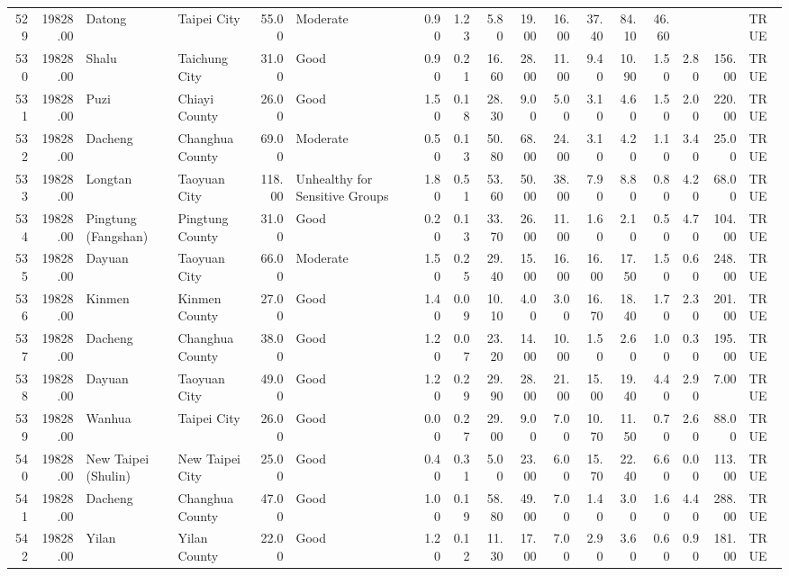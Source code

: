 \begin{table}[ht]
\begin{tabular}{rrllrlrrrrrrrrrrl}
  529 & 19828.00 & Datong & Taipei City & 55.00 & Moderate & 0.90 & 1.23 & 5.80 & 19.00 & 16.00 & 37.40 & 84.10 & 46.60 &  &  & TRUE \\ 
  530 & 19828.00 & Shalu & Taichung City & 31.00 & Good & 0.90 & 0.21 & 16.60 & 28.00 & 11.00 & 9.40 & 10.90 & 1.50 & 2.80 & 156.00 & TRUE \\ 
  531 & 19828.00 & Puzi & Chiayi County & 26.00 & Good & 1.50 & 0.18 & 28.30 & 9.00 & 5.00 & 3.10 & 4.60 & 1.50 & 2.00 & 220.00 & TRUE \\ 
  532 & 19828.00 & Dacheng & Changhua County & 69.00 & Moderate & 0.50 & 0.13 & 50.80 & 68.00 & 24.00 & 3.10 & 4.20 & 1.10 & 3.40 & 25.00 & TRUE \\ 
  533 & 19828.00 & Longtan & Taoyuan City & 118.00 & Unhealthy for Sensitive Groups & 1.80 & 0.51 & 53.60 & 50.00 & 38.00 & 7.90 & 8.80 & 0.80 & 4.20 & 68.00 & TRUE \\ 
  534 & 19828.00 & Pingtung (Fangshan) & Pingtung County & 31.00 & Good & 0.20 & 0.13 & 33.70 & 26.00 & 11.00 & 1.60 & 2.10 & 0.50 & 4.70 & 104.00 & TRUE \\ 
  535 & 19828.00 & Dayuan & Taoyuan City & 66.00 & Moderate & 1.50 & 0.25 & 29.40 & 15.00 & 16.00 & 16.00 & 17.50 & 1.50 & 0.60 & 248.00 & TRUE \\ 
  536 & 19828.00 & Kinmen & Kinmen County & 27.00 & Good & 1.40 & 0.09 & 10.10 & 4.00 & 3.00 & 16.70 & 18.40 & 1.70 & 2.30 & 201.00 & TRUE \\ 
  537 & 19828.00 & Dacheng & Changhua County & 38.00 & Good & 1.20 & 0.07 & 23.20 & 14.00 & 10.00 & 1.50 & 2.60 & 1.00 & 0.30 & 195.00 & TRUE \\ 
  538 & 19828.00 & Dayuan & Taoyuan City & 49.00 & Good & 1.20 & 0.29 & 29.90 & 28.00 & 21.00 & 15.00 & 19.40 & 4.40 & 2.90 & 7.00 & TRUE \\ 
  539 & 19828.00 & Wanhua & Taipei City & 26.00 & Good & 0.00 & 0.27 & 29.00 & 9.00 & 7.00 & 10.70 & 11.50 & 0.70 & 2.60 & 88.00 & TRUE \\ 
  540 & 19828.00 & New Taipei (Shulin) & New Taipei City & 25.00 & Good & 0.40 & 0.31 & 5.00 & 23.00 & 6.00 & 15.70 & 22.40 & 6.60 & 0.00 & 113.00 & TRUE \\ 
  541 & 19828.00 & Dacheng & Changhua County & 47.00 & Good & 1.00 & 0.19 & 58.80 & 49.00 & 7.00 & 1.40 & 3.00 & 1.60 & 4.40 & 288.00 & TRUE \\ 
  542 & 19828.00 & Yilan & Yilan County & 22.00 & Good & 1.20 & 0.12 & 11.30 & 17.00 & 7.00 & 2.90 & 3.60 & 0.60 & 0.90 & 181.00 & TRUE \\ 

\end{tabular}
\end{table}
